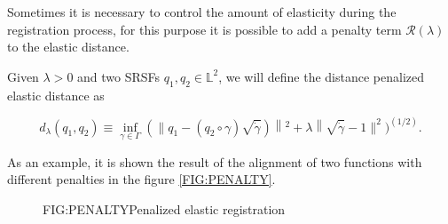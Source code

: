 
Sometimes it is necessary to control the amount of elasticity during the
registration process, for this purpose it is possible to add a penalty term
$\mathcal{R}(\lambda)$ to the elastic distance.

Given $\lambda > 0$ and two SRSFs $q_1, q_2 \in \mathbb{L}^2$, we will define
the distance penalized elastic distance as

$$
d_{\lambda}\left(q_{1}, q_{2}\right) \equiv \inf _{\gamma \in \Gamma}\left(
\| q_{1}-\left(q_{2} \circ \gamma\right) \sqrt{\dot{\gamma}}\right)\left\|^{2}+
\lambda\right\| \sqrt{\dot{\gamma}}-1 \|^{2} )^{(1 / 2)}.
$$

As an example, it is shown the result of the alignment of two functions with different penalties in the figure
\ref{FIG:PENALTY}.

\begin{figure}[Penalized elastic registration]{FIG:PENALTY}{Penalized elastic registration}
\end{figure}
